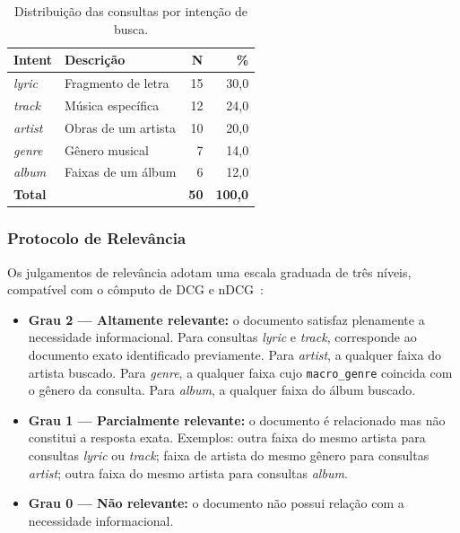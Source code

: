 \documentclass[12pt]{article}
\begin{document}
\begin{table}[ht]
\centering
\caption{Distribuição das consultas por intenção de busca.}
\label{tab:topics}
\begin{tabular}{l L{5.0cm} rr}
\toprule
\textbf{Intent} & \textbf{Descrição} & \textbf{N} & \textbf{\%} \\
\midrule
\textit{lyric}  & Fragmento de letra & 15 & 30{,}0 \\
\textit{track}  & Música específica   & 12 & 24{,}0 \\
\textit{artist} & Obras de um artista & 10 & 20{,}0 \\
\textit{genre}  & Gênero musical      & 7  & 14{,}0 \\
\textit{album}  & Faixas de um álbum  & 6  & 12{,}0 \\
\midrule
\textbf{Total}  &                     & \textbf{50} & \textbf{100{,}0} \\
\bottomrule
\end{tabular}
\end{table}

\subsubsection{Protocolo de Relevância}

Os julgamentos de relevância adotam uma escala graduada de três níveis,
compatível com o cômputo de DCG e nDCG~\cite{jarvelin2002cumulated}:

\begin{itemize}
  \item \textbf{Grau 2 --- Altamente relevante:} o documento satisfaz plenamente
    a necessidade informacional. Para consultas \textit{lyric} e \textit{track},
    corresponde ao documento exato identificado previamente. Para \textit{artist},
    a qualquer faixa do artista buscado. Para \textit{genre}, a qualquer faixa
    cujo \texttt{macro\_genre} coincida com o gênero da consulta. Para
    \textit{album}, a qualquer faixa do álbum buscado.
  \item \textbf{Grau 1 --- Parcialmente relevante:} o documento é relacionado
    mas não constitui a resposta exata. Exemplos: outra faixa do mesmo artista
    para consultas \textit{lyric} ou \textit{track}; faixa de artista do mesmo
    gênero para consultas \textit{artist}; outra faixa do mesmo artista para
    consultas \textit{album}.
  \item \textbf{Grau 0 --- Não relevante:} o documento não possui relação com a
    necessidade informacional.
\end{itemize}
\end{document}
